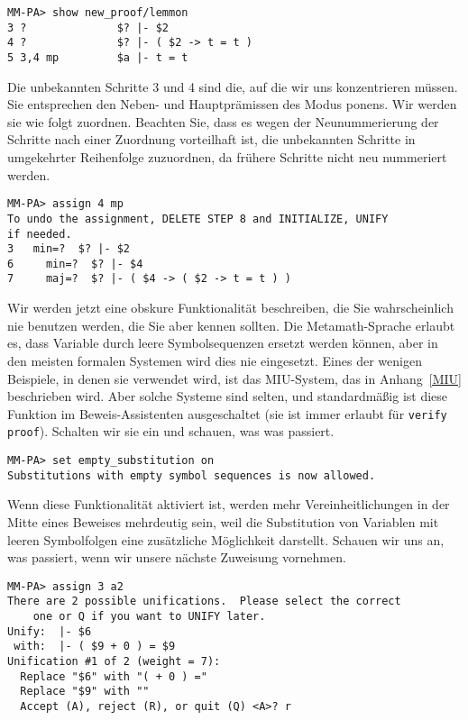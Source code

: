 \begin{verbatim}
MM-PA> show new_proof/lemmon
3 ?              $? |- $2
4 ?              $? |- ( $2 -> t = t )
5 3,4 mp         $a |- t = t
\end{verbatim}

Die unbekannten Schritte 3 und 4 sind die, auf die wir uns konzentrieren müssen.  Sie entsprechen den Neben- und Hauptprämissen des Modus ponens.  Wir werden sie wie folgt zuordnen.  Beachten Sie, dass es wegen der Neunummerierung der Schritte nach einer Zuordnung vorteilhaft ist, die unbekannten Schritte in umgekehrter Reihenfolge zuzuordnen, da frühere Schritte nicht neu nummeriert werden.

\begin{verbatim}
MM-PA> assign 4 mp
To undo the assignment, DELETE STEP 8 and INITIALIZE, UNIFY
if needed.
3   min=?  $? |- $2
6     min=?  $? |- $4
7     maj=?  $? |- ( $4 -> ( $2 -> t = t ) )
\end{verbatim}

Wir werden jetzt eine obskure Funktionalität beschreiben, die Sie wahr\-schein\-lich nie benutzen werden, die Sie aber kennen sollten.  Die Metamath-Sprache erlaubt es, dass Variable durch leere Symbolsequenzen ersetzt werden können, aber in den meisten formalen Systemen wird dies nie eingesetzt.  Eines der wenigen Beispiele, in denen sie verwendet wird, ist das MIU-System, das in Anhang~\ref{MIU} beschrieben wird.  Aber solche Systeme sind selten, und standardmäßig ist diese Funktion im Beweis-Assistenten ausgeschaltet (sie ist immer erlaubt für {\tt verify proof}).  Schalten wir sie ein und schauen, was was passiert.

\begin{verbatim}
MM-PA> set empty_substitution on
Substitutions with empty symbol sequences is now allowed.
\end{verbatim}

Wenn diese Funktionalität aktiviert ist, werden mehr Vereinheitlichungen in der Mitte eines Beweises mehrdeutig sein, weil die Substitution von Variablen mit leeren Symbolfolgen eine zusätzliche Möglichkeit darstellt.  Schauen wir uns an, was passiert, wenn wir unsere nächste Zuweisung vornehmen.

\begin{verbatim}
MM-PA> assign 3 a2
There are 2 possible unifications.  Please select the correct
    one or Q if you want to UNIFY later.
Unify:  |- $6
 with:  |- ( $9 + 0 ) = $9
Unification #1 of 2 (weight = 7):
  Replace "$6" with "( + 0 ) ="
  Replace "$9" with ""
  Accept (A), reject (R), or quit (Q) <A>? r
\end{verbatim}

